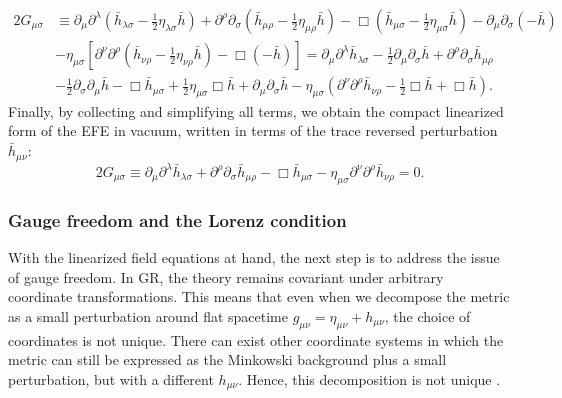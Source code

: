 \begin{equation}
\begin{aligned}
2G_{\mu\sigma}
&\equiv
\partial_\mu \partial^{\lambda} 
\!\left( \bar{h}_{\lambda\sigma} - \tfrac{1}{2}\eta_{\lambda\sigma}\bar{h} \right)
+ \partial^{\rho} \partial_{\sigma}
\!\left( \bar{h}_{\mu\rho} - \tfrac{1}{2}\eta_{\mu\rho}\bar{h} \right)
- \Box\!\left( \bar{h}_{\mu\sigma} - \tfrac{1}{2}\eta_{\mu\sigma}\bar{h} \right) - \partial_\mu \partial_\sigma(-\bar{h}) \\
&- \eta_{\mu\sigma} \left[
\partial^{\nu}\partial^{\rho}
\!\left( \bar{h}_{\nu\rho} - \tfrac{1}{2}\eta_{\nu\rho}\bar{h} \right)
- \Box(-\bar{h})
\right] = \partial_\mu \partial^{\lambda}\bar{h}_{\lambda\sigma}
- \tfrac{1}{2}\partial_\mu \partial_\sigma \bar{h}
+ \partial^{\rho}\partial_{\sigma}\bar{h}_{\mu\rho} \\
&- \tfrac{1}{2}\partial_\sigma \partial_\mu \bar{h} - \Box \bar{h}_{\mu\sigma} + \tfrac{1}{2}\eta_{\mu\sigma}\Box\bar{h}
+ \partial_\mu \partial_\sigma \bar{h} 
- \eta_{\mu\sigma}\!\left(
\partial^{\nu}\partial^{\rho}\bar{h}_{\nu\rho}
- \tfrac{1}{2}\Box\bar{h}
+ \Box\bar{h} \right).
\end{aligned}
\end{equation}
Finally, by collecting and simplifying all terms, we obtain the compact linearized form of the EFE in vacuum, written in terms of the trace reversed perturbation $\bar{h}_{\mu\nu}$:
\begin{equation}
2G_{\mu\sigma} \equiv
\partial_\mu\partial^{\lambda}\bar{h}_{\lambda\sigma}
+ \partial^{\rho}\partial_{\sigma}\bar{h}_{\mu\rho}
- \Box \bar{h}_{\mu\sigma}
- \eta_{\mu\sigma}\partial^{\nu}\partial^{\rho}\bar{h}_{\nu\rho}
= 0.
\label{linearizedEFE}
\end{equation}

\subsubsection{Gauge freedom and the Lorenz condition}

With the linearized field equations at hand, the next step is to address the issue of gauge freedom.  
In GR, the theory remains covariant under arbitrary coordinate transformations.  
This means that even when we decompose the metric as a small perturbation around flat spacetime $g_{\mu\nu} = \eta_{\mu\nu} + h_{\mu\nu}$, the choice of coordinates is not unique. There can exist other coordinate systems in which the metric
can still be expressed as the Minkowski background plus a small perturbation, but with a different
$h_{\mu\nu}$. Hence, this decomposition is not unique \cite{llibrecarroll2004lectures}.

